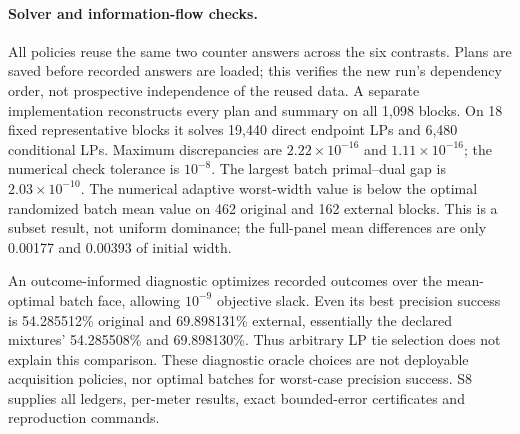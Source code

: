 \paragraph{Solver and information-flow checks.}
All policies reuse the same two counter answers across the six contrasts.
Plans are saved before recorded answers are loaded; this verifies the new
run's dependency order, not prospective independence of the reused data.
A separate implementation reconstructs every plan and summary on all 1,098
blocks. On 18 fixed representative blocks it solves 19,440 direct endpoint
LPs and 6,480 conditional LPs. Maximum discrepancies are
$2.22\times10^{-16}$ and $1.11\times10^{-16}$; the numerical check tolerance
is $10^{-8}$. The largest batch primal--dual gap is $2.03\times10^{-10}$.
The numerical adaptive worst-width value is below the optimal randomized
batch mean value on 462 original and 162 external blocks. This is a
subset result, not uniform dominance; the full-panel mean differences are
only 0.00177 and 0.00393 of initial width.

An outcome-informed diagnostic optimizes recorded outcomes over the
mean-optimal batch face, allowing $10^{-9}$ objective slack. Even its best
precision success is 54.285512\% original and 69.898131\% external,
essentially the declared mixtures' 54.285508\% and 69.898130\%.
Thus arbitrary LP tie selection does not explain this comparison. These
diagnostic oracle choices are not deployable acquisition policies, nor
optimal batches for worst-case precision success. S8 supplies all ledgers,
per-meter results, exact bounded-error certificates and reproduction commands.
